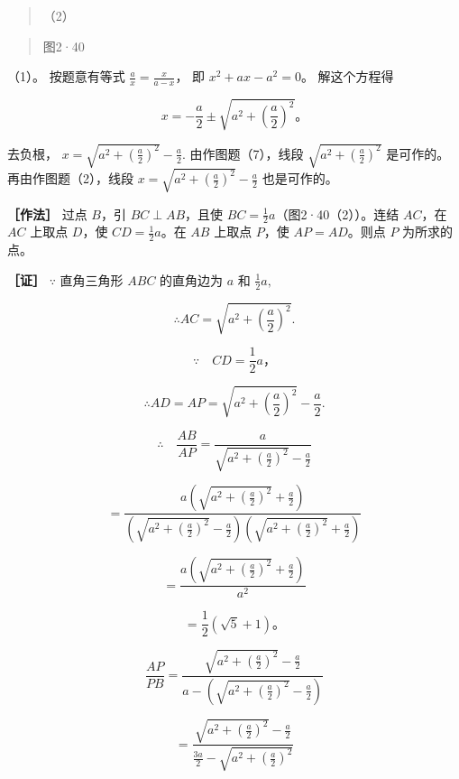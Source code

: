 \begin{quote}
（2）
\end{quote}

\begin{quote}
图2·40
\end{quote}

（1）。 按题意有等式 \(\frac{a}{x} = \frac{x}{a - x}\)， 即
\(x^{2} + ax - a^{2} = 0\)。 解这个方程得

\[
x=-\frac{a}{2}\pm\sqrt{a^2+\left(\frac{a}{2}\right)^2}\text{。}
\]

去负根， \(x = \sqrt{a^2 + \left(\frac{a}{2}\right)^2} -\frac{a}{2}.\)
由作图题（7），线段 \(\sqrt{a^2 + \left(\frac{a}{2}\right)^2}\)
是可作的。再由作图题（2），线段
\(x = \sqrt{a^2 + \left(\frac{a}{2}\right)^2} - \frac{a}{2}\)
也是可作的。

\textbf{［作法］} 过点 \(B\)，引 \(BC \perp AB\)，且使
\(BC = \frac{1}{2} a\)（图2·40（2））。连结 \(AC\)，在 \(AC\) 上取点
\(D\)，使 \(CD = \frac{1}{2} a\)。在 \(AB\) 上取点 \(P\)，使
\(AP = AD\)。则点 \(P\) 为所求的点。

\textbf{［证］} \(\because\) 直角三角形 \(ABC\) 的直角边为 \(a\) 和
\(\frac{1}{2} a,\)

\[
\therefore A C = \sqrt {a ^ {2} + \left(\frac {a}{2}\right) ^ {2}}.
\]

\[
\because \quad C D = \frac {1}{2} a\text{，}
\]

\[
\therefore A D = A P = \sqrt {a ^ {2} + \left(\frac {a}{2}\right) ^ {2}} - \frac {a}{2}.
\]

\[
\therefore \quad \frac {A B}{A P} = \frac {a}{\sqrt {a ^ {2} + \left(\frac {a}{2}\right) ^ {2}} - \frac {a}{2}}
\]

\[
= \frac {a \left(\sqrt {a ^ {2} + \left(\frac {a}{2}\right) ^ {2}} + \frac {a}{2}\right)}{\left(\sqrt {a ^ {2} + \left(\frac {a}{2}\right) ^ {2}} - \frac {a}{2}\right) \left(\sqrt {a ^ {2} + \left(\frac {a}{2}\right) ^ {2}} + \frac {a}{2}\right)}
\]

\[
= \frac {a \left(\sqrt {a ^ {2} + \left(\frac {a}{2}\right) ^ {2}} + \frac {a}{2}\right)}{a ^ {2}}
\]

\[
= \frac {1}{2} (\sqrt {5} + 1)\text{。}
\]

\[
\frac {A P}{P B} = \frac {\sqrt {a ^ {2} + \left(\frac {a}{2}\right) ^ {2}} - \frac {a}{2}}{a - \left(\sqrt {a ^ {2} + \left(\frac {a}{2}\right) ^ {2}} - \frac {a}{2}\right)}
\]

\[
= \frac {\sqrt {a ^ {2} + \left(\frac {a}{2}\right) ^ {2}} - \frac {a}{2}}{\frac {3 a}{2} - \sqrt {a ^ {2} + \left(\frac {a}{2}\right) ^ {2}}}
\]

